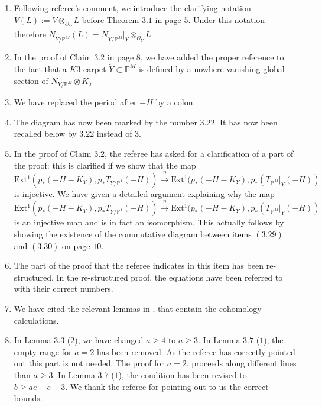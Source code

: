 \documentclass[11pt,twoside]{amsart}
\theoremstyle{plain}
\numberwithin{equation}{section}
\theoremstyle{definition}
\begin{document}
\begin{enumerate}
\item[$(9)$] Following referee's comment, we introduce the clarifying notation $\widetilde{V}(L):=\widetilde{V}\otimes_{\mathcal{O}_{\widetilde{Y}}} L$ before Theorem $3.1$ in page $5$. Under this notation therefore $N_{\widetilde{Y}/\mathbb{P}^M}(L) = N_{\widetilde{Y}/\mathbb{P}^M}|_Y \otimes_{\mathcal{O}_Y}L$ 

\item[$(10)$] In the proof of Claim $3.2$ in page $8$, we have added the proper reference to the fact that a $K3$ carpet $\widetilde{Y} \subset \mathbb{P}^M$ is defined by a nowhere vanishing global section of $N_{Y/\mathbb{P}^M} \otimes K_Y$ 

\item[$(11)$] We have replaced the period after $-H$ by a colon.

\item[$(12)$] The diagram has now been marked by the number $3.22$. It has now been recalled below by $3.22$ instead of $3$.   

\item[$(13)$] In the proof of Claim $3.2$, the referee has asked for a clarification of a part of the proof: this is clarified if we show that the map $\operatorname{Ext^1}(p_*(-H-K_Y), 
 p_*T_{Y/\mathbb{P}^1}(-H))  \xrightarrow[]{\eta} \operatorname{Ext^1}(p_*(-H-K_Y), 
 p_*(T_{\mathbb{P}^M}|_Y(-H))$ is injective.  We have given a detailed argument explaining why the map \\ $\operatorname{Ext^1}(p_*(-H-K_Y), 
 p_*T_{Y/\mathbb{P}^1}(-H))  \xrightarrow[]{\eta} \operatorname{Ext^1}(p_*(-H-K_Y), 
 p_*(T_{\mathbb{P}^M}|_Y(-H))$ is an injective map and is in fact an isomorphism. This actually follows by showing the existence of the commutative diagram \textcolor{black}{between items $(3.29)$ and $(3.30)$ on page $10$.}

\item[$(14)$] The part of the proof that the referee indicates in this item has been re-structured. In the re-structured proof, the equations have been referred to with their correct numbers.

\item[$(15)$] We have cited the relevant lemmas in \cite{BMR21}, that contain the cohomology calculations.

\item[$(16)$] In Lemma $3.3$ ($2$), we have changed $a \geq 4$ to $a \geq 3$. In Lemma $3.7$ ($1$), the empty range for $a = 2$ has been removed. As the referee has correctly pointed out this part is not needed. The proof for $a = 2$, proceeds along different lines than $a \geq 3$. In Lemma $3.7$ ($1$), the condition has been revised to $b \geq ae-e+3$. We thank the referee for pointing out to us the correct bounds. 
 

\end{enumerate}
\end{document}
